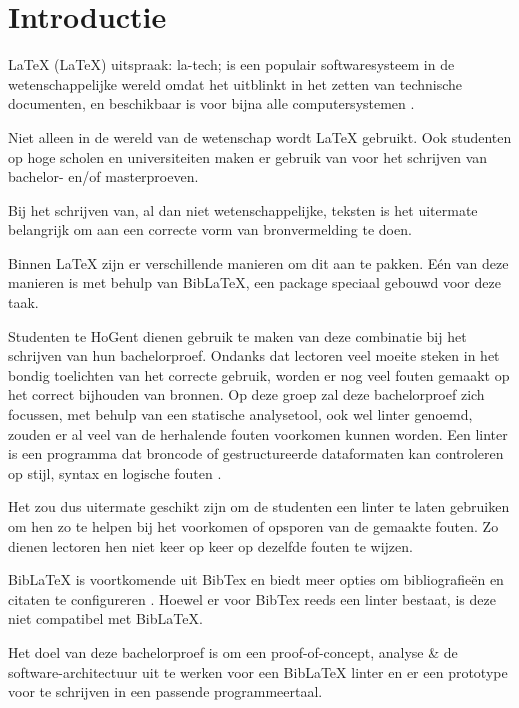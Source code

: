 
\section{Introductie}%
\label{sec:introductie}

LaTeX (\LaTeX) uitspraak: la-tech; is een populair softwaresysteem in de wetenschappelijke wereld omdat het uitblinkt in het zetten van technische documenten,
en beschikbaar is voor bijna alle computersystemen \autocite{Wiki23}.

Niet alleen in de wereld van de wetenschap wordt LaTeX gebruikt. Ook studenten op hoge scholen en universiteiten maken er gebruik van voor het schrijven van bachelor- en/of masterproeven.

Bij het schrijven van, al dan niet wetenschappelijke, teksten is het uitermate belangrijk om aan een correcte vorm van bronvermelding te doen.

Binnen LaTeX zijn er verschillende manieren om dit aan te pakken. Eén van deze manieren is met behulp van BibLaTeX, een package speciaal gebouwd voor deze taak.

Studenten te HoGent dienen gebruik te maken van deze combinatie bij het schrijven van hun bachelorproef. Ondanks dat lectoren veel moeite steken in het bondig toelichten van het correcte gebruik, worden er nog veel fouten gemaakt op het correct bijhouden van bronnen. 
Op deze groep zal deze bachelorproef zich focussen, met behulp van een statische analysetool, ook wel linter genoemd, zouden er al veel van de herhalende fouten voorkomen kunnen worden. Een linter is een programma dat broncode of gestructureerde dataformaten kan controleren op stijl, syntax en logische fouten \autocite{Kamunya2023}.

Het zou dus uitermate geschikt zijn om de studenten een linter te laten gebruiken om hen zo te helpen bij het voorkomen of opsporen van de gemaakte fouten. Zo dienen lectoren hen niet keer op keer op dezelfde fouten te wijzen.

BibLaTeX is voortkomende uit BibTex en biedt meer opties om bibliografieën en citaten te configureren \autocite{Cassidy2013}. Hoewel er voor BibTex reeds een linter bestaat, is deze niet compatibel met BibLaTeX.

Het doel van deze bachelorproef is om een proof-of-concept, analyse \& de software-architectuur uit te werken voor een BibLaTeX linter en er een prototype voor te schrijven in een passende programmeertaal. 

